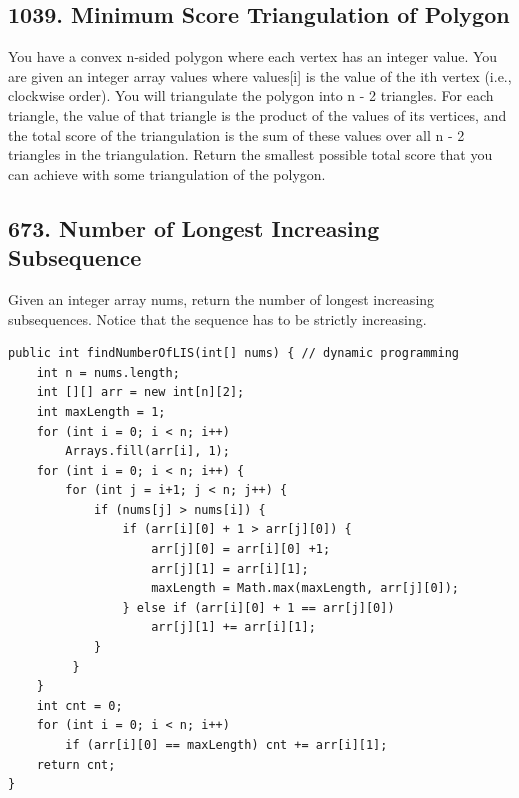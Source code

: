 \documentclass[9pt, b5paper]{article}
\begin{document}
\subsection{1039. Minimum Score Triangulation of Polygon}
\label{sec-4-31}
You have a convex n-sided polygon where each vertex has an integer value. You are given an integer array values where values[i] is the value of the ith vertex (i.e., clockwise order).
You will triangulate the polygon into n - 2 triangles. For each triangle, the value of that triangle is the product of the values of its vertices, and the total score of the triangulation is the sum of these values over all n - 2 triangles in the triangulation.
Return the smallest possible total score that you can achieve with some triangulation of the polygon.

\subsection{673. Number of Longest Increasing Subsequence}
\label{sec-4-32}
Given an integer array nums, return the number of longest increasing subsequences.
Notice that the sequence has to be strictly increasing.
\begin{verbatim}
public int findNumberOfLIS(int[] nums) { // dynamic programming
    int n = nums.length;
    int [][] arr = new int[n][2];
    int maxLength = 1;
    for (int i = 0; i < n; i++) 
        Arrays.fill(arr[i], 1);
    for (int i = 0; i < n; i++) {
        for (int j = i+1; j < n; j++) {
            if (nums[j] > nums[i]) {
                if (arr[i][0] + 1 > arr[j][0]) {
                    arr[j][0] = arr[i][0] +1;
                    arr[j][1] = arr[i][1];
                    maxLength = Math.max(maxLength, arr[j][0]);
                } else if (arr[i][0] + 1 == arr[j][0])
                    arr[j][1] += arr[i][1];
            }
         }
    }
    int cnt = 0;
    for (int i = 0; i < n; i++) 
        if (arr[i][0] == maxLength) cnt += arr[i][1];
    return cnt;
}
\end{verbatim}
\end{document}
